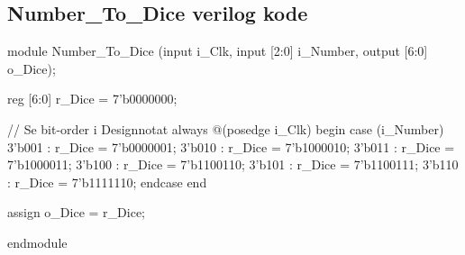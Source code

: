 \subsection{Number\_To\_Dice verilog kode}
\begin{verilogcode}
module Number_To_Dice
    (input i_Clk,
     input [2:0] i_Number,
     output [6:0] o_Dice);

 reg [6:0] r_Dice = 7'b0000000;

 // Se bit-order i Designnotat 
 always @(posedge i_Clk)
    begin
        case (i_Number)
            3'b001 : r_Dice = 7'b0000001;
            3'b010 : r_Dice = 7'b1000010;
            3'b011 : r_Dice = 7'b1000011;
            3'b100 : r_Dice = 7'b1100110;
            3'b101 : r_Dice = 7'b1100111;
            3'b110 : r_Dice = 7'b1111110;
        endcase
    end

 assign o_Dice = r_Dice;

endmodule
\end{verilogcode}
